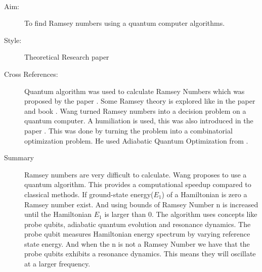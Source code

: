 \documentclass{Assignment}
\begin{document}
\newpage
\cite{PhysRevA.93.032301}~
\begin{description}
	\item [Aim:]
	To find Ramsey numbers using a quantum computer algorithms.
	\item [Style:]
	Theoretical Research paper
	\item [Cross References:]
	Quantum algorithm was used to calculate Ramsey Numbers which was proposed by the paper \cite{gaitan2012ramsey}.
	Some Ramsey theory is explored like in the paper \cite{burr1981generalized} and book \cite{graham1980ramsey}.
	Wang turned Ramsey numbers into a decision problem on a quantum computer.
	A humiliation is used, this was also introduced in the paper \cite{Deutsch1989}.
	This was done by turning the problem into a combinatorial optimization problem.
	He used Adiabatic Quantum Optimization from \cite{farhi2000quantum}.
	
	\item [Summary]
	Ramsey numbers are very difficult to calculate.
	Wang proposes to use a quantum algorithm.
	This provides a computational speedup compared to classical methods.
	If ground-state energy($E_1$) of a Hamiltonian is zero a Ramsey number exist. 
	And using bounds of Ramsey Number n is increased until the Hamiltonian $E_1$ is larger than 0.
	The algorithm uses concepts like probe qubits, adiabatic quantum evolution and resonance dynamics. 
	The probe qubit measures Hamiltonian energy spectrum by varying reference state energy. 
	And when the n is not a Ramsey Number we have that the probe qubits exhibits a resonance dynamics.
	This means they will oscillate at a larger frequency.
\end{description}
\end{document}

